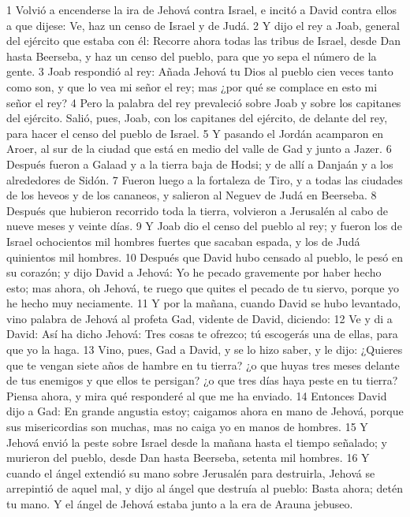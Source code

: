 1 Volvió a encenderse la ira de Jehová contra Israel, e incitó a David contra ellos a que dijese: Ve, haz un censo de Israel y de Judá.
2 Y dijo el rey a Joab, general del ejército que estaba con él: Recorre ahora todas las tribus de Israel, desde Dan hasta Beerseba, y haz un censo del pueblo, para que yo sepa el número de la gente.
3 Joab respondió al rey: Añada Jehová tu Dios al pueblo cien veces tanto como son, y que lo vea mi señor el rey; mas ¿por qué se complace en esto mi señor el rey?
4 Pero la palabra del rey prevaleció sobre Joab y sobre los capitanes del ejército. Salió, pues, Joab, con los capitanes del ejército, de delante del rey, para hacer el censo del pueblo de Israel.
5 Y pasando el Jordán acamparon en Aroer, al sur de la ciudad que está en medio del valle de Gad y junto a Jazer.
6 Después fueron a Galaad y a la tierra baja de Hodsi; y de allí a Danjaán y a los alrededores de Sidón.
7 Fueron luego a la fortaleza de Tiro, y a todas las ciudades de los heveos y de los cananeos, y salieron al Neguev de Judá en Beerseba.
8 Después que hubieron recorrido toda la tierra, volvieron a Jerusalén al cabo de nueve meses y veinte días.
9 Y Joab dio el censo del pueblo al rey; y fueron los de Israel ochocientos mil hombres fuertes que sacaban espada, y los de Judá quinientos mil hombres.
10 Después que David hubo censado al pueblo, le pesó en su corazón; y dijo David a Jehová: Yo he pecado gravemente por haber hecho esto; mas ahora, oh Jehová, te ruego que quites el pecado de tu siervo, porque yo he hecho muy neciamente.
11 Y por la mañana, cuando David se hubo levantado, vino palabra de Jehová al profeta Gad, vidente de David, diciendo:
12 Ve y di a David: Así ha dicho Jehová: Tres cosas te ofrezco; tú escogerás una de ellas, para que yo la haga.
13 Vino, pues, Gad a David, y se lo hizo saber, y le dijo: ¿Quieres que te vengan siete años de hambre en tu tierra? ¿o que huyas tres meses delante de tus enemigos y que ellos te persigan? ¿o que tres días haya peste en tu tierra? Piensa ahora, y mira qué responderé al que me ha enviado.
14 Entonces David dijo a Gad: En grande angustia estoy; caigamos ahora en mano de Jehová, porque sus misericordias son muchas, mas no caiga yo en manos de hombres.
15 Y Jehová envió la peste sobre Israel desde la mañana hasta el tiempo señalado; y murieron del pueblo, desde Dan hasta Beerseba, setenta mil hombres.
16 Y cuando el ángel extendió su mano sobre Jerusalén para destruirla, Jehová se arrepintió de aquel mal, y dijo al ángel que destruía al pueblo: Basta ahora; detén tu mano. Y el ángel de Jehová estaba junto a la era de Arauna jebuseo. 
